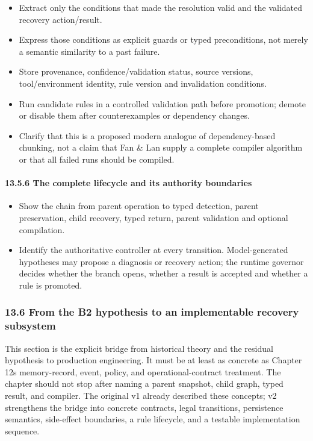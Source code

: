 \begin{itemize}
\tightlist
\item
  Extract only the conditions that made the resolution valid and the validated recovery action/result.
\item
  Express those conditions as explicit guards or typed preconditions, not merely a semantic similarity to a past failure.
\item
  Store provenance, confidence/validation status, source versions, tool/environment identity, rule version and invalidation conditions.
\item
  Run candidate rules in a controlled validation path before promotion; demote or disable them after counterexamples or dependency changes.
\item
  Clarify that this is a proposed modern analogue of dependency-based chunking, not a claim that Fan \& Lan supply a complete compiler algorithm or that all failed runs should be compiled.
\end{itemize}

\paragraph{13.5.6 The complete lifecycle and its authority boundaries}\label{1356-the-complete-lifecycle-and-its-authority-boundaries}

\begin{itemize}
\tightlist
\item
  Show the chain from parent operation to typed detection, parent preservation, child recovery, typed return, parent validation and optional compilation.
\item
  Identify the authoritative controller at every transition. Model-generated hypotheses may propose a diagnosis or recovery action; the runtime governor decides whether the branch opens, whether a result is accepted and whether a rule is promoted.
\end{itemize}

\subsubsection{13.6 From the B2 hypothesis to an implementable recovery subsystem}\label{136-from-the-b2-hypothesis-to-an-implementable-recovery-subsystem}

This section is the explicit bridge from historical theory and the residual hypothesis to production engineering. It must be at least as concrete as Chapter 12\textquotesingle s memory-record, event, policy, and operational-contract treatment. The chapter should not stop after naming a parent snapshot, child graph, typed result, and compiler. The original v1 already described these concepts; v2 strengthens the bridge into concrete contracts, legal transitions, persistence semantics, side-effect boundaries, a rule lifecycle, and a testable implementation sequence.

